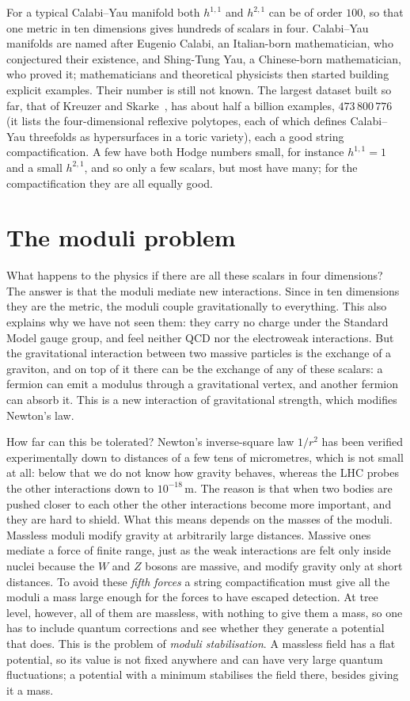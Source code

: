 For a typical Calabi--Yau manifold both $h^{1,1}$ and $h^{2,1}$ can be of order $100$, so that one metric in ten dimensions gives hundreds of scalars in four. Calabi--Yau manifolds are named after Eugenio Calabi, an Italian-born mathematician, who conjectured their existence, and Shing-Tung Yau, a Chinese-born mathematician, who proved it; mathematicians and theoretical physicists then started building explicit examples.
Their number is still not known. The largest dataset built so far, that of Kreuzer and Skarke~\cite{KreuzerSkarke}, has about half a billion examples, $473\,800\,776$ (it lists the four-dimensional reflexive polytopes, each of which defines Calabi--Yau threefolds as hypersurfaces in a toric variety), each a good string compactification. A few have both Hodge numbers small, for instance $h^{1,1} = 1$ and a small $h^{2,1}$, and so only a few scalars, but most have many; for the compactification they are all equally good.

\section{The moduli problem}
\label{sec:L2-moduli-problem}

What happens to the physics if there are all these scalars in four dimensions? The answer is that the moduli mediate new interactions.
Since in ten dimensions they are the metric, the moduli couple gravitationally to everything. This also explains why we have not seen them: they carry no charge under the Standard Model gauge group, and feel neither QCD nor the electroweak interactions. But the gravitational interaction between two massive particles is the exchange of a graviton, and on top of it there can be the exchange of any of these scalars: a fermion can emit a modulus through a gravitational vertex, and another fermion can absorb it. This is a new interaction of gravitational strength, which modifies Newton's law.

How far can this be tolerated? Newton's inverse-square law $1/r^2$ has been verified experimentally down to distances of a few tens of micrometres, which is not small at all: below that we do not know how gravity behaves, whereas the LHC probes the other interactions down to $10^{-18}\,$m. The reason is that when two bodies are pushed closer to each other the other interactions become more important, and they are hard to shield.
What this means depends on the masses of the moduli. Massless moduli modify gravity at arbitrarily large distances. Massive ones mediate a force of finite range, just as the weak interactions are felt only inside nuclei because the $W$ and $Z$ bosons are massive, and modify gravity only at short distances. To avoid these \emph{fifth forces} a string compactification must give all the moduli a mass large enough for the forces to have escaped detection. At tree level, however, all of them are massless, with nothing to give them a mass, so one has to include quantum corrections and see whether they generate a potential that does. This is the problem of \emph{moduli stabilisation}. A massless field has a flat potential, so its value is not fixed anywhere and can have very large quantum fluctuations; a potential with a minimum stabilises the field there, besides giving it a mass.

